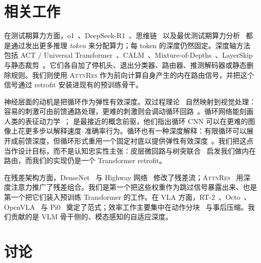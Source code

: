 \documentclass{article}
\newcommand{\attnres}{\textsc{AttnRes}}
\begin{document}
\section{相关工作}
\label{sec:related}

在测试期算力方面，o1~\citep{openai2024o1}、DeepSeek-R1~\citep{deepseek2025r1}、思维链~\citep{wei2022chain} 以及最优测试期算力分析~\citep{snell2024scaling} 都是通过发出更多推理 \emph{token} 来分配算力；每 token 的深度仍然固定。深度轴方法包括 ACT / Universal Transformer~\citep{graves2016adaptive, dehghani2018universal}、CALM~\citep{schuster2022confident}、Mixture-of-Depths~\citep{raposo2024mixture}、LayerSkip~\citep{elhoushi2024layerskip} 与静态裁剪~\citep{gromov2024unreasonable, men2024shortgpt}。它们各自加了停机头、退出分类器、路由器、推测解码器或静态删除规则。我们则使用 \attnres{} 作为前向计算自身产生的内在路由信号，并把这个信号通过 retrofit 安装进现有的预训练骨干。

神经层面的动机是把循环作为弹性有效深度。双过程理论~\citep{kahneman2011thinking} 自然映射到视觉处理：容易的刺激可由前馈通路处理，更难的刺激则会调动循环回路~\citep{lamme2000distinct, kar2019recurrent, dicarlo2012does}。循环网络能刻画人类的表征动力学~\citep{kietzmann2019recurrence}；\citet{spoerer2020recurrent} 是最接近的概念前驱，他们指出循环 CNN 可以在更难的图像上花更多步以解释速度--准确率行为。循环也有一种深度解释：有限循环可以展开成前馈深度，但循环形式重用一个固定衬底以提供弹性有效深度~\citep{vanbergen2020going}。我们把这点当作设计目标，而不是认知忠实性主张：皮层微回路与树突联合~\citep{bastos2012canonical, buschman2007topdown, larkum2013cellular} 启发我们做内在路由，而我们的实现仍是一个 Transformer retrofit。

在残差架构方面，DenseNet~\citep{huang2017densely} 与 Highway 网络~\citep{srivastava2015highway} 修改了残差流；\attnres{}~\citep{chen2026attnres} 用深度注意力推广了残差组合。我们是第一个把这些权重作为跳过信号暴露出来、也是第一个把它们装入预训练 Transformer 的工作。在 VLA 方面，RT-2~\citep{brohan2023rt}、Octo~\citep{team2024octo}、OpenVLA~\citep{kim2024openvla} 与 Pi0~\citep{black2024pi0} 奠定了范式；效率工作主要集中在动作分块~\citep{zhao2023learning} 与事后压缩。我们贡献的是 VLM 骨干侧的、模态感知的自适应深度。

\section{讨论}
\label{sec:discussion}
\end{document}

